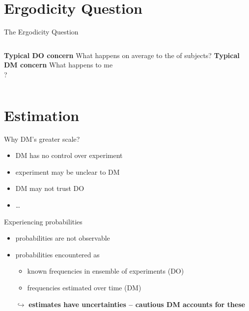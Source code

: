 \section{Ergodicity Question}

\begin{frame}{The Ergodicity Question}
\begin{columns}[T]
	\bc \textbf{Typical DO concern} \ec
	What happens on average to the  of subjects?
\centering \vspace{4em}  \red{\large $\neq$}
	\bc \textbf{Typical DM concern} \ec
	What happens to me \\
	?
\end{columns}
\end{frame}


\section{Estimation}

\begin{frame}{Why DM's greater scale?}
\begin{itemize}
  \item DM has no control over experiment
  \item experiment may be unclear to DM
  \item DM may not trust DO
  \item \ldots
\end{itemize}
\end{frame}

\begin{frame}{Experiencing probabilities}

\begin{itemize}
  \item probabilities are not observable
  \item probabilities encountered as
  	\begin{itemize}
  		\item known frequencies in ensemble of experiments (DO)
  		\item frequencies estimated over time (DM)
  	\end{itemize}
  \item[$\hookrightarrow$] \textbf{estimates have uncertainties -- cautious DM accounts for these}

\end{itemize}
\end{frame}



